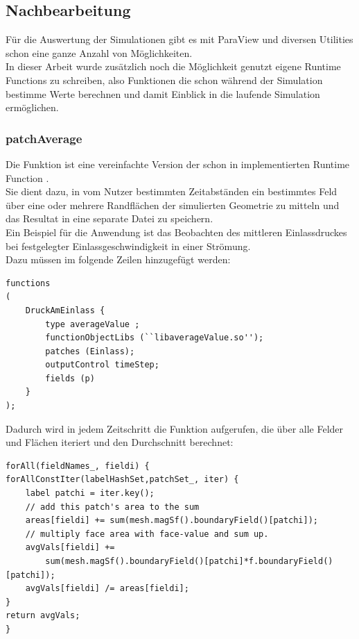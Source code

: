 \subsection{Nachbearbeitung}
Für die Auswertung der Simulationen gibt es mit ParaView \cite{paraview} und diversen \openfoam{} Utilities schon eine ganze Anzahl von Möglichkeiten.\\
In dieser Arbeit wurde zusätzlich noch die Möglichkeit genutzt eigene Runtime Functions zu schreiben, also Funktionen die schon während der Simulation bestimme Werte berechnen und damit Einblick in die laufende Simulation ermöglichen.
%
\subsubsection{patchAverage}
Die Funktion  ist eine vereinfachte Version der schon in \openfoam{} implementierten Runtime Function .\\
Sie dient dazu, in vom Nutzer bestimmten Zeitabständen ein bestimmtes Feld über eine oder mehrere Randflächen der simulierten Geometrie zu mitteln und das Resultat in eine separate Datei zu speichern.\\
Ein Beispiel für die Anwendung ist das Beobachten des mittleren Einlassdruckes bei festgelegter Einlassgeschwindigkeit in einer Strömung.\\
Dazu müssen im  folgende Zeilen hinzugefügt werden:
%
\begin{lstlisting}
functions
(
    DruckAmEinlass {
        type averageValue ;
        functionObjectLibs (``libaverageValue.so'');
        patches (Einlass);
        outputControl timeStep;
        fields (p)
    }
);
\end{lstlisting}
%
Dadurch wird in jedem Zeitschritt die Funktion  aufgerufen, die über alle Felder und Flächen iteriert und den Durchschnitt berechnet:
%
\begin{lstlisting}
forAll(fieldNames_, fieldi) {    
forAllConstIter(labelHashSet,patchSet_, iter) {
    label patchi = iter.key();
    // add this patch's area to the sum
    areas[fieldi] += sum(mesh.magSf().boundaryField()[patchi]);
    // multiply face area with face-value and sum up.
    avgVals[fieldi] +=
        sum(mesh.magSf().boundaryField()[patchi]*f.boundaryField()[patchi]);
    avgVals[fieldi] /= areas[fieldi];
}
return avgVals;
}
\end{lstlisting}
%
